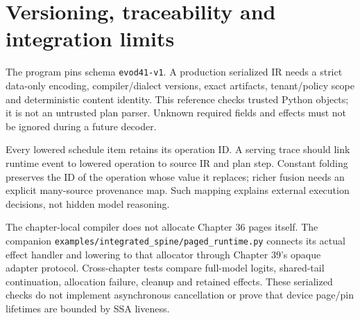\section{Versioning, traceability and integration limits}
\label{evod41:boundaries}
The program pins schema \texttt{evod41-v1}. A production serialized IR needs
a strict data-only encoding, compiler/dialect versions, exact artifacts,
tenant/policy scope and deterministic content identity. This reference checks
trusted Python objects; it is not an untrusted plan parser. Unknown required
fields and effects must not be ignored during a future decoder.

Every lowered schedule item retains its operation ID. A serving trace should
link runtime event to lowered operation to source IR and plan step. Constant
folding preserves the ID of the operation whose value it replaces; richer
fusion needs an explicit many-source provenance map. Such mapping explains
external execution decisions, not hidden model reasoning.

The chapter-local compiler does not allocate Chapter 36 pages itself.
The companion \texttt{examples/integrated\_spine/paged\_runtime.py} connects
its actual effect handler and lowering to that allocator through Chapter 39's
opaque adapter protocol. Cross-chapter tests compare full-model logits,
shared-tail continuation, allocation failure, cleanup and retained effects.
These serialized checks do not implement asynchronous cancellation or prove
that device page/pin lifetimes are bounded by SSA liveness.

